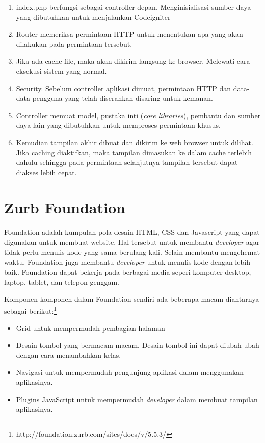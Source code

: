 \begin{enumerate}
		\item index.php berfungsi sebagai controller depan. Menginisialisasi sumber daya yang dibutuhkan untuk menjalankan Codeigniter
		\item Router memeriksa permintaan HTTP untuk menentukan apa yang akan dilakukan pada permintaan tersebut.
		\item Jika ada cache file, maka akan dikirim langsung ke browser. Melewati cara eksekusi sistem yang normal.
		\item Security. Sebelum controller aplikasi dimuat, permintaan HTTP dan data-data pengguna yang telah diserahkan disaring untuk kemanan.
		\item Controller memuat model, pustaka inti (\textit{core libraries}), pembantu dan sumber daya lain yang dibutuhkan untuk memproses permintaan khusus.
		\item Kemudian tampilan akhir dibuat dan dikirim ke web browser untuk dilihat. Jika caching diaktifkan, maka tampilan dimasukan ke dalam cache terlebih dahulu sehingga pada permintaan selanjutnya tampilan tersebut dapat diakses lebih cepat.
	\end{enumerate}


\section{Zurb Foundation}
\label{zurbfoundation}

\paragraph{}  Foundation adalah kumpulan pola desain HTML, CSS dan Javascript yang dapat digunakan untuk membuat website. Hal tersebut untuk membantu \textit{developer} agar tidak perlu menulis kode yang sama berulang kali. Selain membantu mengehemat waktu, Foundation juga membantu \textit{developer} untuk menulis kode dengan lebih baik. Foundation dapat bekerja pada berbagai media seperi komputer desktop, laptop, tablet, dan telepon genggam.\cite{zurbfoundation:17} 

Komponen-komponen dalam Foundation sendiri ada beberapa macam diantarnya sebagai berikut:\footnote{http://foundation.zurb.com/sites/docs/v/5.5.3/}

\begin{itemize}
	\item  Grid untuk mempermudah pembagian halaman
	\item  Desain tombol yang bermacam-macam. Desain tombol ini dapat diubah-ubah dengan cara menambahkan kelas.
	\item  Navigasi untuk mempermudah pengunjung aplikasi dalam menggunakan aplikasinya.
	\item  Plugins JavaScript untuk mempermudah \textit{developer} dalam membuat tampilan aplikasinya.
\end{itemize}


